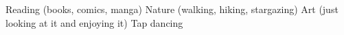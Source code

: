 %
%
%

\begin{scholarship}
	\scholarshipentry
		{\faAngleRight}
		{Reading (books, comics, manga)}
	\scholarshipentry
		{\faAngleRight}
		{Nature (walking, hiking, stargazing)}
	\scholarshipentry
		{\faAngleRight}
		{Art (just looking at it and enjoying it)}
	\scholarshipentry
		{\faAngleRight}
		{Tap dancing}
\end{scholarship}